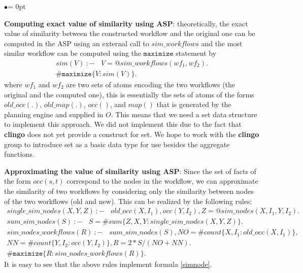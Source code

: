 \documentclass{new_tlp}
\begin{document}
\begin{list}{$\bullet$}{\itemsep = 0pt \parsep=1pt \topsep=1pt \leftmargin=10pt} 
\item {\bf Computing exact value of similarity using ASP}: theoretically, the exact value of similarity between the constructed workflow and the original one can be computed in the ASP using an external call to $sim\_workflows$ and the most similar workflow can be computed using the 
$\mathtt{maximize}$ statement by 
% 
\begin{align} 
sim(V)\: {:}{-}\:\:\:\: V = @sim\_workflows(wf_1, wf_2). \\
\# \mathtt{maximize} \{V : sim(V)\}. 
\end{align}
%
where $wf_1$ and $wf_2$ are two sets of atoms encoding the two workflows (the original and the computed one), this is essentially the sets 
of atoms of the forms $old\_occ(.)$, $old\_map(.)$, $occ()$, and $map()$ that is generated by the planning engine and supplied in $O$.  
This means that we need a set data structure to implement this approach. We did not implement this due to the fact that  
{\bf clingo} does not yet provide a construct for set. We hope to work with the {\bf clingo} group to introduce set as a basic data type for use besides the aggregate functions. 

%

\item {\bf Approximating the value of similarity using ASP}: Since the set of facts of the form $occ(s,t)$ correspond to the nodes in the workflow, we can approximate the similarity of  two workflows by considering only the similarity between nodes of the two workflows (old and new). This can be realized by the following rules: 
\begin{align*} 
single\_sim\_nodes(X,Y,Z)\:{:}{-}\:\:\:\: old\_occ(X,I_1),occ(Y,I_2), Z=@sim\_nodes(X,I_1,Y,I_2).\\
sum\_sim\_nodes(S)\: {:}{-}\:\:\:\: S = \#sum\{Z,X,Y : single\_sim\_nodes(X,Y,Z)\}. \\
sim\_nodes\_workflows(R)\: {:}{-}\:\:\:\: sum\_sim\_nodes(S), NO =  \#count \{X,I_1: old\_occ(X,I_1)\}, \\
 NN = \#count\{Y,I_2: occ(Y,I_2)\}, R = 2*S/(NO + NN). \\
 \#\mathtt{maximize}\{R : sim\_nodes\_workflows(R)\}. 
\end{align*} 
It is easy to see that the above rules implement formula \eqref{simnode}.  


\end{list}
\end{document}
